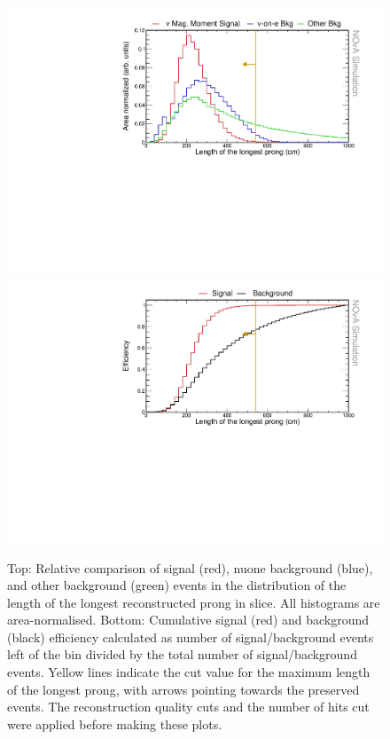 \begin{figure}[hbtp]
\centering
\includegraphics[width=.9\textwidth]{Plots/NuMMEventSelection/N1Cut_longestProng.pdf}
\includegraphics[width=.9\textwidth]{Plots/NuMMEventSelection/NuMM_N1Cut_longestProngleft_Eff.pdf}
\caption[Length of the longest prong cut for basic event selection]{Top: Relative comparison of signal (red), \acrshort{nuone} background (blue), and other background (green) events in the distribution of the length of the longest reconstructed prong in slice. All histograms are area-normalised. Bottom: Cumulative signal (red) and background (black) efficiency calculated as number of signal/background events left of the bin divided by the total number of signal/background events. Yellow lines indicate the cut value for the maximum length of the longest prong, with arrows pointing towards the preserved events. The reconstruction quality cuts and the number of hits cut were applied before making these plots.}
\label{fig:NuMMCutsLongestProng}
\end{figure}

